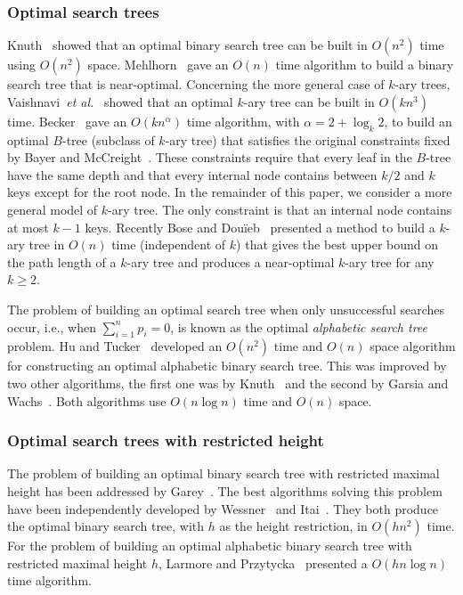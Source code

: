 \documentclass{llncs}\usepackage[english]{babel}
\begin{document}
\subsubsection*{Optimal search trees}
Knuth~\cite{optbst} showed that an optimal binary search tree can be built in $O(n^2)$ time using $O(n^2)$ space. Mehlhorn~\cite{mehlornbestbound} gave an $O(n)$ time algorithm to build a binary search tree that is near-optimal. Concerning the more general case of $k$-ary trees, Vaishnavi~\emph{et al.}~\cite{optbtrees} showed that an optimal $k$-ary tree can be built in $O(k n^3)$ time. Becker~\cite{newoptbtrees} gave an $O(k n^\alpha)$ time algorithm, with $\alpha= 2+\log_{k} 2$, to build an optimal $B$-tree (subclass of $k$-ary tree) that satisfies the original constraints fixed by Bayer and McCreight~\cite{btrees}. These constraints require that every leaf in the $B$-tree have the same depth and that every internal node contains between $k/2$ and $k$ keys except for the root node. In the remainder of this paper, we consider a more general model of $k$-ary tree. The only constraint is that an internal node contains at most $k-1$ keys. Recently Bose and Dou\"ieb~\cite{nearoptbtree} presented a method to build a $k$-ary tree in $O(n)$ time (independent of $k$) that gives the best upper bound on the path length of a $k$-ary tree and produces a near-optimal $k$-ary tree for any $k\geq 2$. 

The problem of building an optimal search tree when only unsuccessful searches occur, i.e., when $\sum_{i=1}^n p_i=0$, is known as the optimal \emph{alphabetic search tree} problem. Hu and Tucker~\cite{n2optalphatrees} developed an $O(n^2)$ time and $O(n)$ space algorithm for constructing an optimal alphabetic binary search tree. This was improved by two other algorithms, the first one was by Knuth~\cite{knuthart} and the second by Garsia and Wachs~\cite{Garsiaoptalphatrees}. Both algorithms use $O(n \log n)$ time and $O(n)$ space. 

\subsubsection*{Optimal search trees with restricted height}
The problem of building an optimal binary search tree with restricted maximal height has been addressed by Garey~\cite{Garey}. The best algorithms solving this problem have been independently developed by Wessner~\cite{Wessner} and Itai~\cite{Itai}. They both produce the optimal binary search tree, with  $h$ as the height restriction, in $O(h n^2)$ time. For the problem of building an optimal alphabetic binary search tree with restricted maximal height $h$, Larmore and Przytycka~\cite{larmoreAlpha} presented a $O(hn \log n)$ time algorithm. 
\end{document}
